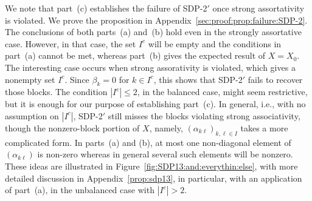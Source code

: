 We note that part~(c) establishes the failure of SDP-2$'$ once strong assortativity is violated. We prove the proposition in Appendix~\ref{sec:proof:prop:failure:SDP-2}. The conclusions of both parts~(a) and~(b) hold even in the strongly assortative case. However, in that case, the set $I^c$ will be empty and the conditions in part~(a) cannot be met, whereas part~(b) gives the expected result of $X = X_0$. The interesting case occurs when strong assorativity is violated, which gives a nonempty set $I^c$. Since $\beta_k = 0$ for $k \in I^c$, this shows that SDP-2$'$ fails to recover those blocks. The condition $|I^c| \le 2$, in the balanced case, might seem restrictive, but it is enough for our purpose of establishing part~(c). In general, i.e., with no assumption on $|I^c|$, SDP-2$'$ still misses the blocks violating strong associativity, though the nonzero-block portion of $X$, namely, $(\alpha_{k \ell})_{k,\ell \in I}$ takes a more complicated form. In parts~(a) and (b), at most one non-diagonal element of $(\alpha_{k \ell})$ is non-zero whereas in general several such elements will be nonzero. These ideas are illustrated in Figure~\ref{fig:SDP13:and:everythin:else}, with more detailed discussion in Appendix~\ref{prop:sdp13}, in particular, with an application of part~(a), in the unbalanced case with $|I^c| > 2$.




